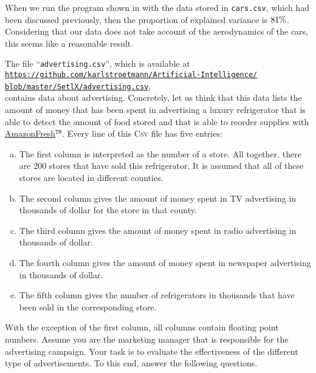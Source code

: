 When we run the program shown in  with the data stored in \texttt{cars.csv},
which had been discussed previously, then the proportion of explained variance is $81 \mathtt{\symbol{37}}$.  Considering that our data does
not take account of the aerodynamics of the cars, this seems like a reasonable result.


\exercise
The file ``\texttt{advertising.csv}'', which is available at
\\[0.2cm]
\hspace*{1.3cm}
\href{https://github.com/karlstroetmann/Artificial-Intelligence/blob/master/SetlX/advertising.csv}{\texttt{https://github.com/karlstroetmann/Artificial-Intelligence/\\
\hspace*{1.22cm} blob/master/SetlX/advertising.csv}},
\\[0.2cm]
contains data about advertising.  Concretely, let us think that this data lists the amount of money that has
been spent in advertising a luxury refrigerator that is able to detect the amount of food stored and that is
able to reorder supplies with \href{https://en.wikipedia.org/wiki/AmazonFresh}{AmazonFresh}$^\mathtt{TM}$.
Every line of this \textsc{Csv} file has five entries:
\begin{enumerate}[(a)]
\item The first column is interpreted as the number of a store.  All together, there are 200 stores that have sold this
      refrigerator.  It is assumed that all of these stores are located in different counties.
\item The second column gives the amount of money spent in TV advertising in thousands of dollar for the store in
      that county.
\item The third column gives the amount of money spent in radio advertising in thousands of dollar.
\item The fourth column gives the amount of money spent in newspaper advertising in thousands of dollar.
\item The fifth column gives the number of refrigerators in thousands that have been sold in the corresponding store.
\end{enumerate}
With the exception of the first column, all columns contain floating point numbers.
Assume you are the marketing manager that is responsible for the advertising campaign.  Your task is to
evaluate the effectiveness of the different type of advertisements.  To this end, answer the following questions.
